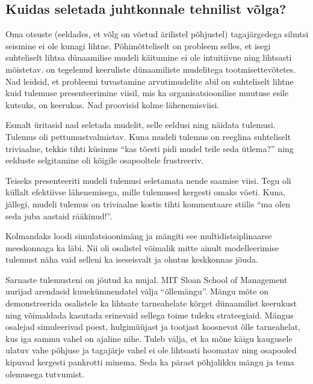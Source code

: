 \documentclass{tufte-book}
\begin{document}
\subsection{Kuidas seletada juhtkonnale tehnilist võlga?}
Oma otsuste (eeldades, et võlg on võetud ärilistel põhjustel) tagajärgedega silmtsi seismine ei ole kunagi lihtne. Põhimõtteliselt on probleem selles, et isegi suhteliselt lihtsa dünaamilise mudeli käitumine ei ole intuitiivne ning lihtsasti mõistetav. \citeauthor{ledet1994manufacturing} on tegelenud keeruliste dünaamiliste mudelitega tootmisettevõtetes\cite{ledet1994manufacturing}. Nad leidsid, et probleemi tuvastamine arvutimudelite abil on suhteliselt lihtne kuid tulemuse presenteerimine viisil, mis ka organisatsioonilise muutuse esile kutsuks, on keerukas. Nad proovisid kolme lähenemisviisi.

Esmalt üritasid nad seletada mudelit, selle eeldusi ning näidata tulemusi. Tulemus oli pettumustvalmistav. Kuna mudeli tulemus on reeglina suhteliselt triviaalne, tekkis tihti küsimus \enquote{kas tõesti pidi mudel teile seda ütlema?} ning eelduste selgitamine oli kõigile osapooltele frustreeriv.

Teiseks presenteeriti mudeli tulemusi seletamata nende saamise viisi. Tegu oli küllalt efektiivse lähenemisega, mille tulemused kergesti omaks võeti. Kuna, jällegi, mudeli tulemus on triviaalne kostis tihti kommentaare stiilis \enquote{ma olen seda juba aastaid rääkinud!}.

Kolmandaks loodi simulatsioonimäng ja mängiti see multidistsiplinaarse meeskonnaga ka läbi. Nii oli osalistel võimalik mitte ainult modelleerimise tulemust näha vaid selleni ka iseseisvalt ja ohutus keskkonnas jõuda. 

Sarnaste tulemusteni on jõutud ka mujal. MIT Sloan School of Management uurijad arendasid kuuekümnendatel välja \enquote{õllemängu}\cite{sterman1984instructions}. Mängu mõte on demonstreerida osalistele ka lihtsate tarneahelate kõrget dünaamilist keerukust ning võimaldada kasutada erinevaid sellega toime tuleku strateegiaid. Mängus osalejad simuleerivad poest, hulgimüüjast ja tootjast koosnevat õlle tarneahelat, kus iga sammu vahel on ajaline nihe. Tuleb välja, et ka mõne käigu kaugusele ulatuv vahe põhjuse ja tagajärje vahel ei ole lihtsasti hoomatav ning osapooled kipuvad kergesti pankrotti minema. Seda ka pärast põhjalikku mängu ja tema olemusega tutvumist. 
\end{document}
